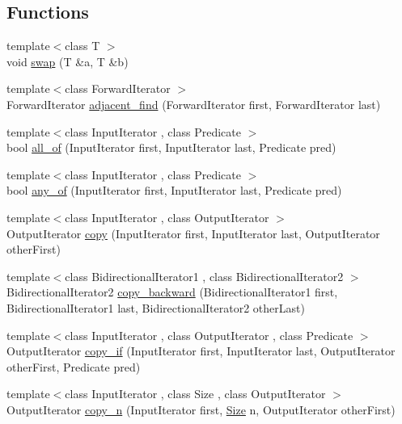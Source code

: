 \subsection*{Functions}
\begin{DoxyCompactItemize}
\item 
{\footnotesize template$<$class T $>$ }\\void \hyperlink{namespaceprism_a6430516ab4f2e2a7f43323acb6b559d8}{swap} (T \&a, T \&b)
\item 
{\footnotesize template$<$class Forward\+Iterator $>$ }\\Forward\+Iterator \hyperlink{namespaceprism_a82052418345794a13044c15d8e32dd89}{adjacent\+\_\+find} (Forward\+Iterator first, Forward\+Iterator last)
\item 
{\footnotesize template$<$class Input\+Iterator , class Predicate $>$ }\\bool \hyperlink{namespaceprism_aba366b328f3b6161e6115c16b7153c6d}{all\+\_\+of} (Input\+Iterator first, Input\+Iterator last, Predicate pred)
\item 
{\footnotesize template$<$class Input\+Iterator , class Predicate $>$ }\\bool \hyperlink{namespaceprism_a5d0e3ddb9f698759635572f1220ec0ca}{any\+\_\+of} (Input\+Iterator first, Input\+Iterator last, Predicate pred)
\item 
{\footnotesize template$<$class Input\+Iterator , class Output\+Iterator $>$ }\\Output\+Iterator \hyperlink{namespaceprism_ae776f4cd825f79e7af1cf6ee1d90a209}{copy} (Input\+Iterator first, Input\+Iterator last, Output\+Iterator other\+First)
\item 
{\footnotesize template$<$class Bidirectional\+Iterator1 , class Bidirectional\+Iterator2 $>$ }\\Bidirectional\+Iterator2 \hyperlink{namespaceprism_a2564c63b76369cc81ff725a56e818046}{copy\+\_\+backward} (Bidirectional\+Iterator1 first, Bidirectional\+Iterator1 last, Bidirectional\+Iterator2 other\+Last)
\item 
{\footnotesize template$<$class Input\+Iterator , class Output\+Iterator , class Predicate $>$ }\\Output\+Iterator \hyperlink{namespaceprism_afbed55ae6769c2d88c125aedc2f3846e}{copy\+\_\+if} (Input\+Iterator first, Input\+Iterator last, Output\+Iterator other\+First, Predicate pred)
\item 
{\footnotesize template$<$class Input\+Iterator , class Size , class Output\+Iterator $>$ }\\Output\+Iterator \hyperlink{namespaceprism_af907f3f5637d4ec056e9b833b6272953}{copy\+\_\+n} (Input\+Iterator first, \hyperlink{classprism_1_1_size}{Size} n, Output\+Iterator other\+First)

\end{DoxyCompactItemize}
